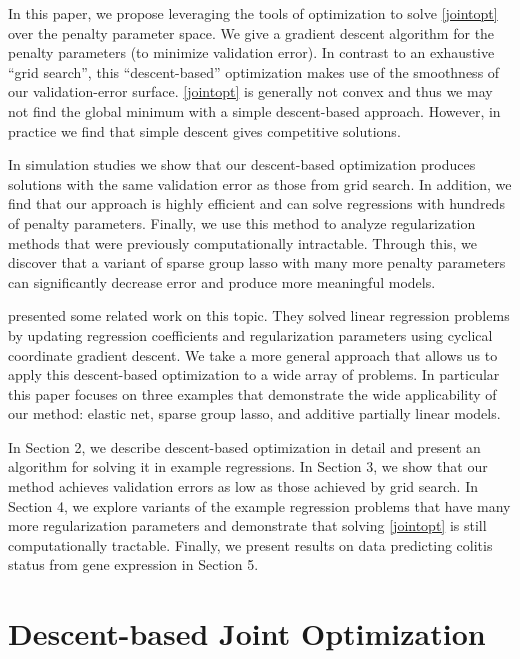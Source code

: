 \documentclass[10pt,letterpaper]{article}
\begin{document}
In this paper, we propose leveraging the tools of optimization to solve \eqref{jointopt} over the penalty parameter space. We give a gradient descent algorithm for the penalty parameters (to minimize validation error). In contrast to an exhaustive ``grid search'', this ``descent-based'' optimization makes use of the smoothness of our validation-error surface. \eqref{jointopt} is generally not convex and thus we may not find the global minimum with a simple descent-based approach. However, in practice we find that simple descent gives competitive solutions.

In simulation studies we show that our descent-based optimization produces solutions with the same validation error as those from grid search. In addition, we find that our approach is highly efficient and can solve regressions with hundreds of penalty parameters. Finally, we use this method to analyze regularization methods that were previously computationally intractable. Through this, we discover that a variant of sparse group lasso with many more penalty parameters can significantly decrease error and produce more meaningful models.

\citet{lorbert2010descent} presented some related work on this topic. They solved linear regression problems by updating regression coefficients and regularization parameters using cyclical coordinate gradient descent. We take a more general approach that allows us to apply this descent-based optimization to a wide array of problems. In particular this paper focuses on three examples that demonstrate the wide applicability of our method: elastic net, sparse group lasso, and additive partially linear models.

In Section 2, we describe descent-based optimization in detail and present an algorithm for solving it in example regressions. In Section 3, we show that our method achieves validation errors as low as those achieved by grid search. In Section 4, we explore variants of the example regression problems that have many more regularization parameters and demonstrate that solving \eqref{jointopt} is still computationally tractable. Finally, we present results on data predicting colitis status from gene expression in Section 5.

\section{Descent-based Joint Optimization}
\end{document}
